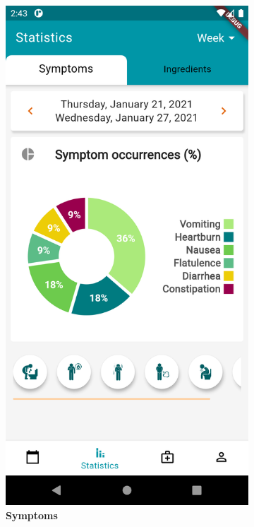 \documentclass [12pt]{article}
\begin{document}
\begin{description}[leftmargin=1cm,rightmargin=1cm]
\begin{figure}[h!]
\begin{subfigure}[tl]{0.3\linewidth}
\includegraphics[width=\linewidth]{statistics1.PNG}
\caption{\textbf{Symptoms}}
\end{subfigure}\hfill
\begin{subfigure}[tr]{0.3\linewidth}

\end{subfigure}
\end{figure}
\end{description}
\end{document}
